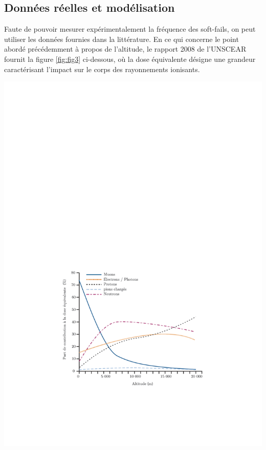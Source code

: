 \documentclass[a4paper,french,bookmarks]{article}
\begin{document}
    \subsection{Données réelles et modélisation}

    Faute de pouvoir mesurer expérimentalement la fréquence des soft-fails, on peut utiliser les données fournies dans la littérature. En ce qui concerne le point abordé précédemment à propos de l'altitude, le rapport 2008 de l'UNSCEAR \cite{UNSCEAR08} fournit la figure \ref{fig:fig3} ci-dessous, où la dose équivalente désigne une grandeur caractérisant l'impact sur le corps des rayonnements ionisants.
    \begin{center}
        
        \begin{minipage}{0.4\linewidth}
            \includegraphics[scale=0.6]{../Images/unscear2008cosmic.pdf}

\end{minipage}
\end{center}
\end{document}
